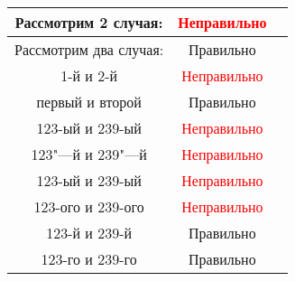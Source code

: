 \documentclass[12pt,a4paper]{book}
\newcommand{\ok}{& \textcolor{green!60!black}{Правильно}}
\newcommand{\bad}{& \textcolor{red}{Неправильно}}
\begin{document}
\begin{enumerate}
\begin{center}\begin{tabular}{|c|c|c|}
\hline Рассмотрим 2 случая: \bad \\
\hline Рассмотрим два случая: \ok \\
\hline 1-й и 2-й \bad \\
\hline первый и второй \ok\\
\hline 123-ый и 239-ый \bad \\
\hline 123"---й и 239"---й \bad \\
\hline 123-ый и 239-ый \bad \\
\hline 123-ого и 239-ого \bad \\
\hline 123-й и 239-й \ok \\
\hline 123-го и 239-го \ok \\
\hline
\end{tabular}\end{center}


\end{enumerate}
\end{document}

